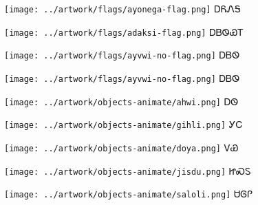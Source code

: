 \documentclass[avery5371]{flashcards}%
\begin{document}
\begin{flashcard}{
\texttt{[image: ../artwork/flags/ayonega-flag.png]}
}
\Huge ᎠᏲᏁᎦ
\end{flashcard}

\begin{flashcard}{
\texttt{[image: ../artwork/flags/adaksi-flag.png]}
}
\Huge ᎠᏴᏫᏯᎢ
\end{flashcard}

\begin{flashcard}{
\texttt{[image: ../artwork/flags/ayvwi-no-flag.png]}
}
\Huge ᎠᏴᏫ
\end{flashcard}

\begin{flashcard}{
\texttt{[image: ../artwork/flags/ayvwi-no-flag.png]}
}
\Huge ᎠᏴᏫ
\end{flashcard}


\begin{flashcard}{
\texttt{[image: ../artwork/objects-animate/ahwi.png]}
}
\Huge ᎠᏫ
\end{flashcard}

\begin{flashcard}{
\texttt{[image: ../artwork/objects-animate/gihli.png]}
}
\Huge ᎩᏟ
\end{flashcard}

\begin{flashcard}{
\texttt{[image: ../artwork/objects-animate/doya.png]}
}
\Huge ᏙᏯ
\end{flashcard}

\begin{flashcard}{
\texttt{[image: ../artwork/objects-animate/jisdu.png]}
}
\Huge ᏥᏍᏚ
\end{flashcard}

\begin{flashcard}{
\texttt{[image: ../artwork/objects-animate/saloli.png]}
}
\Huge ᏌᎶᎵ
\end{flashcard}
\end{document}
